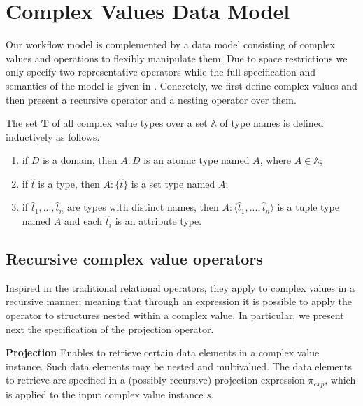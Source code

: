 
\section{Complex Values Data Model}\label{sec:complexValuesDataModel}

Our workflow model is complemented by a data model consisting of complex values and operations to flexibly manipulate them. Due to space restrictions we only specify two representative operators while the full specification and semantics of the model is given in \cite{vcv}. Concretely, we first define complex values and then present a recursive operator and a nesting operator over them.

The set $\mathbf{T}$ of all complex value types over a set $\mathbb{A}$ of type names is defined inductively as follows.

\begin{enumerate}
	\item if $D$ is a domain, then $A:D$ is an atomic type named $A$, where $A \in \mathbb{A}$;
	\item if $\hat{t}$ is a type, then $A:\{\hat{t}\}$ is a set type named $A$;
	\item if $\hat{t}_1, ..., \hat{t}_n$ are types with distinct names, then $A:\langle \hat{t}_1, ..., \hat{t}_n \rangle$ is a tuple type named $A$ and each $\hat{t}_i$ is an attribute type.
\end{enumerate}

\subsection{Recursive complex value operators}

Inspired in the traditional relational operators, they apply to complex values in a recursive manner; meaning that through an expression it is possible to apply the operator to structures nested within a complex value. In particular, we present next the specification of the projection operator.

\vspace*{0.25cm}
\textbf{Projection} Enables to retrieve certain data elements in a complex value instance. Such data elements may be nested and multivalued. The data elements to retrieve are specified in a (possibly recursive) projection expression $\pi_{exp}$, which is applied to the input complex value instance \textit{s}.

